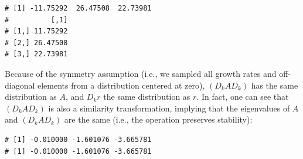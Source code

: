 \documentclass[]{book}
\newenvironment{Shaded}{\begin{snugshade}}{\end{snugshade}}
\newcommand{\CommentTok}[1]{\textcolor[rgb]{0.56,0.35,0.01}{\textit{#1}}}
\newcommand{\DecValTok}[1]{\textcolor[rgb]{0.00,0.00,0.81}{#1}}
\newcommand{\KeywordTok}[1]{\textcolor[rgb]{0.13,0.29,0.53}{\textbf{#1}}}
\newcommand{\NormalTok}[1]{#1}
\newcommand{\OperatorTok}[1]{\textcolor[rgb]{0.81,0.36,0.00}{\textbf{#1}}}
\newcommand{\StringTok}[1]{\textcolor[rgb]{0.31,0.60,0.02}{#1}}
\begin{document}
\begin{Shaded}
\end{Shaded}

\begin{verbatim}
# [1] -11.75292  26.47508  22.73981
#          [,1]
# [1,] 11.75292
# [2,] 26.47508
# [3,] 22.73981
\end{verbatim}

Because of the symmetry assumption (i.e., we sampled all growth rates and off-diagonal elements from a distribution centered at zero), \((D_k A D_k)\) has the same distribution as \(A\), and \(D_k r\) the same distribution as \(r\). In fact, one can see that \((D_k A D_k)\) is also a similarity transformation, implying that the eigenvalues of \(A\) and \((D_k A D_k)\) are the same (i.e., the operation preserves stability):

\begin{Shaded}
\end{Shaded}

\begin{verbatim}
# [1] -0.010000 -1.601076 -3.665781
# [1] -0.010000 -1.601076 -3.665781
\end{verbatim}
\end{document}
